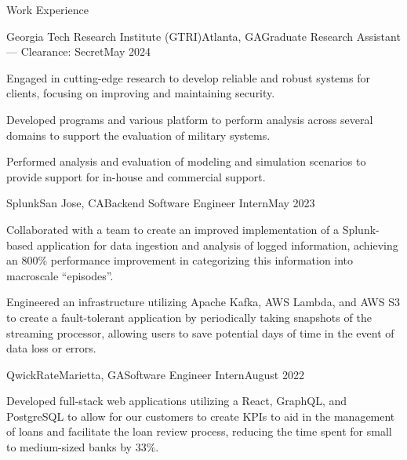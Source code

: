 \documentclass{resume} %
\begin{document}
\begin{workSection}{Work Experience}
    
    \begin{experience}{Georgia Tech Research Institute (GTRI)}{Atlanta{,} GA}{Graduate Research Assistant --- Clearance: Secret}{May 2024}
        \item Engaged in cutting-edge research to develop reliable and robust systems for clients, focusing on improving and maintaining security.
        \item Developed programs and various platform to perform analysis across several domains to support the evaluation of military systems.
        \item Performed analysis and evaluation of modeling and simulation scenarios to provide support for in-house and commercial support.
    \end{experience}
    
    \begin{experience}{Splunk}{San Jose, CA}{Backend Software Engineer Intern}{May 2023}
        \item Collaborated with a team to create an improved implementation of a Splunk-based application for data ingestion and analysis of logged information, achieving an 800\% performance improvement in categorizing this information into macroscale ``episodes''.
        \item Engineered an infrastructure utilizing Apache Kafka, AWS Lambda, and AWS S3 to create a fault-tolerant application by periodically taking snapshots of the streaming processor, allowing users to save potential days of time in the event of data loss or errors.
    \end{experience}
     
    \begin{experience}{QwickRate}{Marietta, GA}{Software Engineer Intern}{August 2022}
        \item Developed full-stack web applications utilizing a React, GraphQL, and PostgreSQL to allow for our customers to create KPIs to aid in the management of loans and facilitate the loan review process, reducing the time spent for small to medium-sized banks by 33\%.
    \end{experience}


\end{workSection}
\end{document}
